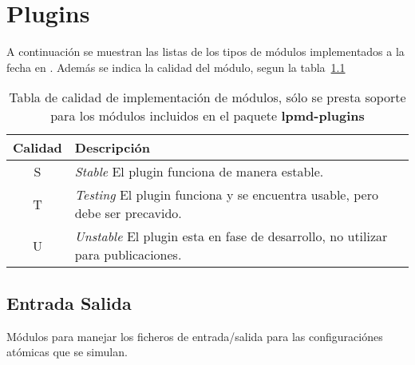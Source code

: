 \appendix

\chapter{Plugins}
A continuaci\'on se muestran las listas de los tipos de m\'odulos implementados a la fecha en {\lpmd}. Adem\'as se indica la calidad del m\'odulo, segun la tabla~\ref{tab:modquality}


\begin{table}[h!]\centering
 \begin{tabular}{|c|l|}\hline\hline
 Calidad & Descripci\'on \\\hline\hline
 S & \textit{Stable} El plugin funciona de manera estable. \\
 T & \textit{Testing} El plugin funciona y se encuentra usable, pero debe ser precavido. \\
 U & \textit{Unstable} El plugin esta en fase de desarrollo, no utilizar para publicaciones. \\
\hline
 \end{tabular}
 \label{tab:modquality}
 \caption{Tabla de calidad de implementaci\'on de m\'odulos, s\'olo se presta soporte para los m\'odulos incluidos en el paquete \textbf{lpmd-plugins}}
\end{table}

\section{Entrada Salida}
M\'odulos para manejar los ficheros de entrada/salida para las configuraci\'ones at\'omicas que se simulan.

